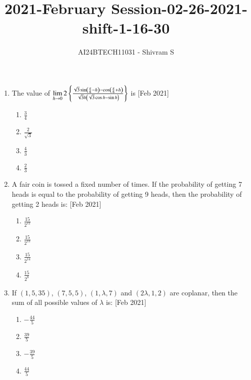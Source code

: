 \documentclass[journal]{IEEEtran}
\begin{document}

\onecolumn

\title{2021-February Session-02-26-2021-shift-1-16-30}
\author{AI24BTECH11031 - Shivram S}
\maketitle
\bigskip

\renewcommand{\thefigure}{\theenumi}
\renewcommand{\thetable}{\theenumi}

\begin{enumerate}
    \item The value of $\lim\limits_{h \to 0} 2\left\{\frac{\sqrt{3}\sin\left(\frac{\pi}{6} - h\right) - \cos\left(\frac{\pi}{6} + h\right)}{\sqrt{3}h\left(\sqrt{3}\cos h - \sin h\right)}\right\}$ is
    \hfill{[Feb 2021]}
    
    \begin{multicols}{4}
    \begin{enumerate}
        \item $\frac{3}{4}$
        \item $\frac{2}{\sqrt{3}}$
        \item $\frac{4}{3}$
        \item $\frac{2}{3}$
    \end{enumerate}
    \end{multicols}

    \item A fair coin is tossed a fixed number of times. If the probability of
    getting 7 heads is equal to the probability of getting 9 heads, then the
    probability of getting 2 heads is:
    \hfill{[Feb 2021]}
    
    \begin{multicols}{4}
    \begin{enumerate}
        \item $\frac{15}{2^{12}}$
        \item $\frac{15}{2^{13}}$
        \item $\frac{15}{2^{14}}$
        \item $\frac{15}{2^{8}}$
    \end{enumerate}
    \end{multicols}

    \item If $(1, 5, 35)$, $(7, 5, 5)$, $(1, \lambda, 7)$ and $(2\lambda, 1, 2)$ are
    coplanar, then the sum of all possible values of $\lambda$ is:
    \hfill{[Feb 2021]}

    \begin{multicols}{4}
    \begin{enumerate}
        \item $-\frac{44}{5}$
        \item $\frac{39}{5}$
        \item $-\frac{39}{5}$
        \item $\frac{44}{5}$
    \end{enumerate}
    \end{multicols}


\end{enumerate}
\end{document}
